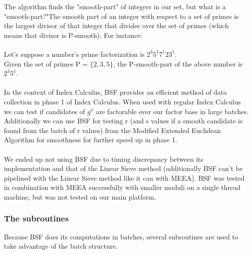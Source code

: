\documentclass{article}
\begin{document}
        The algorithm finds the "smooth-part" of integers in our set, but what is a "smooth-part?"The smooth part of an integer with respect to a set of primes is the largest divisor of that integer that divides over the set of primes (which means that divisor is P-smooth).  For instance: \\
        \\
        Let's suppose a number's prime factorization is $2^{3}5^{1}7^{1}23^{1}$. \\
        Given the set of primes P = $\{2, 3, 5\}$, the P-smooth-part of the above number is $2^{3}5^{1}$. \\
        \\
        In the context of Index Calculus, BSF provides an efficient method of data collection in phase 1 of Index Calculus.  When used with regular Index Calculus we can test if candidates of $g^x$ are factorable over our factor base in large batches.  Additionally we can use BSF for testing r (and s values if a smooth candidate is found from the batch of r values) from the Modified Extended Euclidean Algorithm for smoothness for further speed up in phase 1. \\
        \\
        We ended up not using BSF due to timing discrepancy between its implementation and that of the Linear Sieve method (additionally BSF can't be pipelined with the Linear Sieve method like it can with MEEA).  BSF was tested in combination with MEEA successfully with smaller moduli on a single thread machine, but was not tested on our main platform.

        \subsubsection{The subroutines}

        Because BSF does its computations in batches, several subroutines are used to take advantage of the batch structure.
\end{document}
